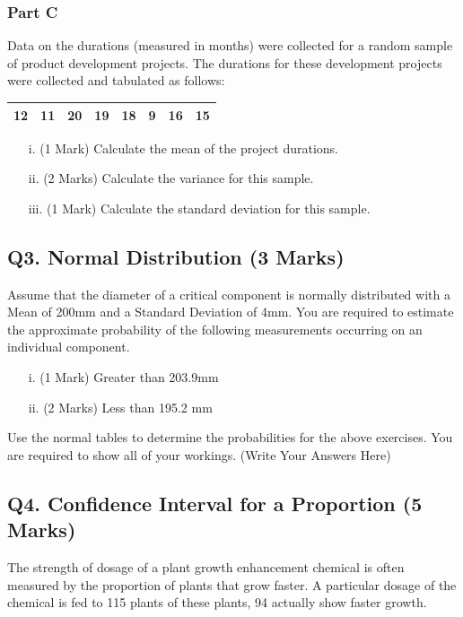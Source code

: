 \documentclass[a4paper,12pt]{article}
\begin{document}
\subsubsection*{Part C} %
Data on the durations (measured in months) were collected for a random sample of product development projects.
The durations for these development projects were collected and tabulated as follows:

\begin{table}[ht]
	\begin{center}
		\begin{tabular}{|rrrrrrrr|}
			
			\hline
			12 & 11 & 20 & 19 & 18 & 9 & 16 & 15 \\
			\hline
		\end{tabular}
	\end{center}
\end{table}

\begin{itemize}
	\item[i.](1 Mark) Calculate the mean of the project durations.
	\item[ii.](2 Marks) Calculate the variance for this sample.
	\item[iii.](1 Mark) Calculate the standard deviation for this sample.
\end{itemize}

\subsection*{Q3. Normal Distribution (3 Marks)} %
Assume that the diameter of a critical component is normally distributed with a Mean of 200mm and a Standard Deviation of 4mm. You are required  to estimate the approximate probability of the following measurements occurring on an individual component.
\begin{itemize}
	\item[i.](1 Mark)	Greater than 203.9mm
	\item[ii.](2 Marks) Less than 195.2 mm
\end{itemize}
\bigskip
\noindent Use the normal tables to determine the probabilities for the above exercises. You are required to show all of your workings.
\newpage
(Write Your Answers Here)
\newpage
\vspace{0.25cm}

\subsection*{Q4. Confidence Interval for a Proportion (5 Marks)}
The strength of dosage of a plant growth enhancement chemical is often measured by the proportion of plants that grow faster. A particular dosage of the chemical is fed to 115 plants of these plants, 94 actually show faster growth.
\end{document}
